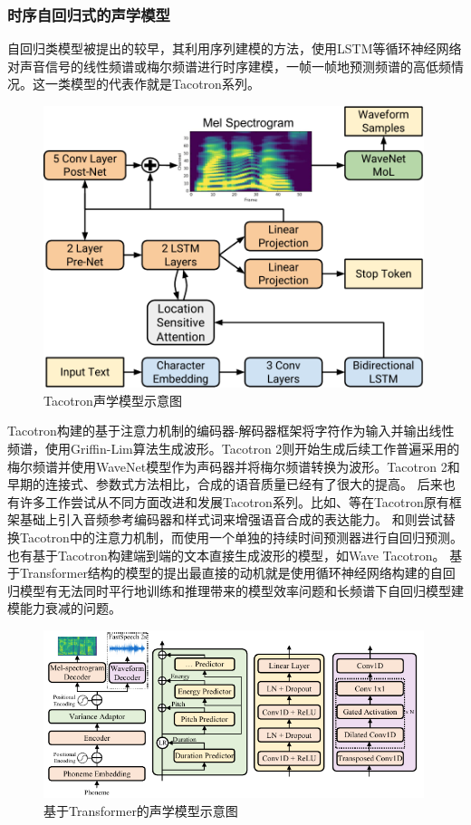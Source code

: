\subsubsection{时序自回归式的声学模型}
自回归类模型被提出的较早，其利用序列建模的方法，使用LSTM等循环神经网络对声音信号的线性频谱或梅尔频谱进行时序建模，一帧一帧地预测频谱的高低频情况。这一类模型的代表作就是Tacotron系列。
\begin{figure}[htbp]
  \includegraphics[width=0.99\textwidth]{figure/related/tacotron2.pdf}
  \caption{Tacotron声学模型示意图}
\end{figure}
Tacotron\citep{tacotron}构建的基于注意力机制的编码器-解码器框架将字符作为输入并输出线性频谱，使用Griffin-Lim算法\citep{GriffinLim}生成波形。Tacotron 2\citep{shen2018natural}则开始生成后续工作普遍采用的梅尔频谱并使用WaveNet\citep{vanwavenet}模型作为声码器并将梅尔频谱转换为波形。Tacotron 2和早期的连接式、参数式方法相比，合成的语音质量已经有了很大的提高。
后来也有许多工作尝试从不同方面改进和发展Tacotron系列。比如\citet{gsttacotron}、\citet{reftacotron}等在Tacotron原有框架基础上引入音频参考编码器和样式词来增强语音合成的表达能力。
\citet{nonattentivetacotron}和\citet{durian}则尝试替换Tacotron中的注意力机制，而使用一个单独的持续时间预测器进行自回归预测。
也有基于Tacotron构建端到端的文本直接生成波形的模型，如Wave Tacotron\citep{wavetacotron}。
基于Transformer结构的模型的提出最直接的动机就是使用循环神经网络构建的自回归模型有无法同时平行地训练和推理带来的模型效率问题和长频谱下自回归模型建模能力衰减的问题。
\begin{figure}[htbp]
  \includegraphics[width=0.99\textwidth]{figure/related/fs2.pdf}
  \caption{基于Transformer的声学模型示意图}
\end{figure}
